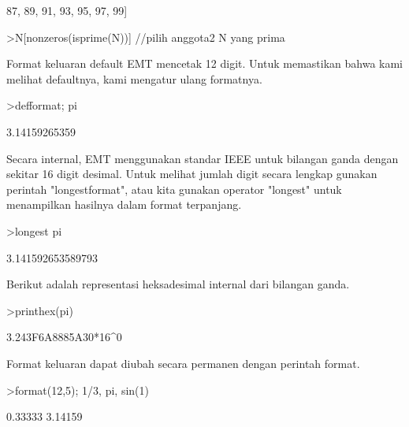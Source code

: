\documentclass{article}
\begin{document}
\begin{eulernotebook}
\begin{euleroutput}
  87,  89,  91,  93,  95,  97,  99]
\end{euleroutput}
\begin{eulerprompt}
>N[nonzeros(isprime(N))] //pilih anggota2 N yang prima
\end{eulerprompt}
\begin{euleroutput}
  [2,  3,  5,  7,  11,  13,  17,  19,  23,  29,  31,  37,  41,  43,  47,
  53,  59,  61,  67,  71,  73,  79,  83,  89,  97]
\end{euleroutput}
\begin{eulercomment}
Format keluaran default EMT mencetak 12 digit. Untuk memastikan bahwa
kami melihat defaultnya, kami mengatur ulang formatnya.
\end{eulercomment}
\begin{eulerprompt}
>defformat; pi
\end{eulerprompt}
\begin{euleroutput}
  3.14159265359
\end{euleroutput}
\begin{eulercomment}
Secara internal, EMT menggunakan standar IEEE untuk bilangan ganda
dengan sekitar 16 digit desimal. Untuk melihat jumlah digit secara
lengkap gunakan perintah "longestformat", atau kita gunakan operator
"longest" untuk menampilkan hasilnya dalam format terpanjang.
\end{eulercomment}
\begin{eulerprompt}
>longest pi
\end{eulerprompt}
\begin{euleroutput}
        3.141592653589793 
\end{euleroutput}
\begin{eulercomment}
Berikut adalah representasi heksadesimal internal dari bilangan ganda.
\end{eulercomment}
\begin{eulerprompt}
>printhex(pi)
\end{eulerprompt}
\begin{euleroutput}
  3.243F6A8885A30*16^0
\end{euleroutput}
\begin{eulercomment}
Format keluaran dapat diubah secara permanen dengan perintah format.
\end{eulercomment}
\begin{eulerprompt}
>format(12,5); 1/3, pi, sin(1)
\end{eulerprompt}
\begin{euleroutput}
      0.33333 
      3.14159 

\end{euleroutput}
\end{eulernotebook}
\end{document}

